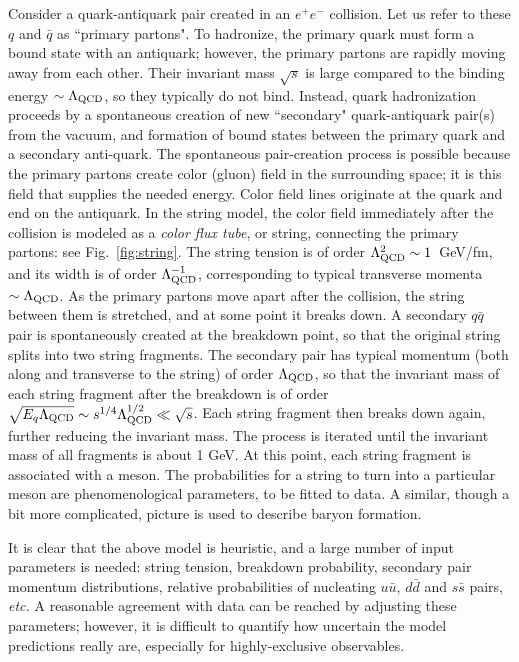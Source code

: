 \documentclass{ws-procs9x6}
\begin{document}
Consider a quark-antiquark pair created in an $e^+e^-$ collision. Let us refer to these $q$ and $\bar{q}$ as ``primary partons". 
To hadronize, the primary quark must form a bound state with an antiquark; however, the primary partons are rapidly moving away from each other. Their invariant mass $\sqrt{s}$ is large compared to the binding energy $\sim\Lambda_{\rm QCD}$, so they typically do not bind. Instead, quark hadronization proceeds by a spontaneous creation of new ``secondary" quark-antiquark pair(s) from the vacuum, and formation of bound states between the primary quark and a secondary anti-quark. The spontaneous pair-creation process is possible because the primary partons create color (gluon) field in the surrounding space; it is this field that supplies the needed energy. Color field lines originate at the quark and end on the antiquark. In the string model, the color field immediately after the collision is modeled as a {\it color flux tube}, or string, connecting the primary partons: see Fig.~\ref{fig:string}. The string tension is of order $\Lambda_{\rm QCD}^2 \sim 1$~GeV/fm, and its width is of order $\Lambda^{-1}_{\rm QCD}$, corresponding to typical transverse momenta $\sim\Lambda_{\rm QCD}$. As the primary partons move apart after the collision, the string between them is stretched, and at some point it breaks down. A secondary $q\bar{q}$ pair is spontaneously created at the breakdown point, so that the original string splits into two string fragments. The secondary pair has typical momentum (both along and transverse to the string) of order $\Lambda_{\rm QCD}$, so that the invariant mass of each string fragment after the breakdown is of order $\sqrt{E_q \Lambda_{\rm QCD}}\sim s^{1/4}\Lambda^{1/2}_{\rm QCD}\ll \sqrt{s}$. Each string fragment then breaks down again, further reducing the invariant mass. The process is iterated until the invariant mass of all fragments is about 1 GeV. At this point, each string fragment is associated with a meson. The probabilities for a string to turn into a particular meson are phenomenological parameters, to be fitted to data. A similar, though a bit more complicated, picture is used to describe baryon formation. 

It is clear that the above model is heuristic, and a large number of input parameters is needed: string tension, breakdown probability, secondary pair momentum distributions, relative probabilities of nucleating $u\bar{u}$, $d\bar{d}$ and $s\bar{s}$ pairs, {\it etc.} A reasonable agreement with data can be reached by adjusting these parameters; however, it is difficult to quantify how uncertain the model predictions really are, especially for highly-exclusive observables. 
\end{document}
